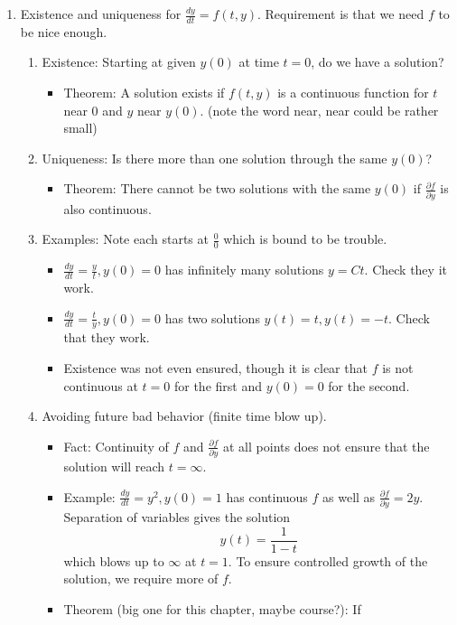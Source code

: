 \documentclass{article}
\newcommand{\ds}{\displaystyle}
\begin{document}
\begin{enumerate}
\item Existence and uniqueness for $\ds \frac{dy}{dt}=f(t,y)$. Requirement is that we need $f$ to be nice enough. 
\begin{enumerate}
\item Existence: Starting at given $y(0)$ at time $t=0$, do we have a solution?
\begin{itemize}
\item Theorem: A solution exists if $f(t,y)$ is a continuous function for $t$ near 0 and $y$ near $y(0)$. (note the word near, near could be rather small)
\end{itemize}
\item Uniqueness: Is there more than one solution through the same $y(0)$?
\begin{itemize}
\item Theorem: There cannot be two solutions with the same $y(0)$ if $\frac{\partial f}{\partial y}$ is also continuous.
\end{itemize}
\item Examples: Note each starts at $\frac{0}{0}$ which is bound to be trouble.
\begin{itemize}
\item $\ds \frac{dy}{dt}=\frac{y}{t}, y(0)=0$ has infinitely many solutions $y=Ct$. Check they it work.
\item $\ds \frac{dy}{dt}=\frac{t}{y}, y(0)=0$ has two solutions $y(t)=t, y(t)=-t$. Check that they work.
\item Existence was not even ensured, though it is clear that $f$ is not continuous at $t=0$ for the first and $y(0)=0$  for the second.
\end{itemize}
\item Avoiding future bad behavior (finite time blow up).
\begin{itemize}
\item Fact: Continuity of $f$ and $\frac{\partial f}{\partial y}$ at all points does not ensure that the solution will reach $t=\infty$.
\item Example: $\ds \frac{dy}{dt}=y^2, y(0)=1$ has continuous $f$ as well as $\frac{\partial f}{\partial y} = 2y$. Separation of variables gives the solution 
\[
y(t)= \frac{1}{1-t}
\]
which blows up to $\infty$ at $t=1$. To ensure controlled growth of the solution, we require more of $f$.
\item Theorem (big one for this chapter, maybe course?): If 

\end{itemize}
\end{enumerate}
\end{enumerate}
\end{document}
